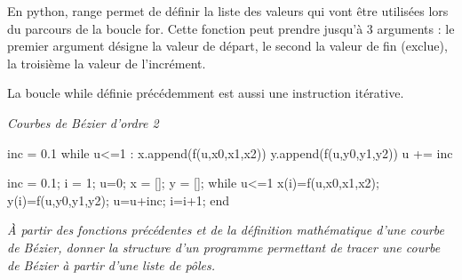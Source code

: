 \documentclass[10pt,fleqn]{article} %
\begin{document}
\begin{rem}
En python, \textsf{range} permet de définir la liste des valeurs qui vont être utilisées lors du parcours de la boucle \textsf{for}.  Cette fonction peut prendre jusqu'à 3 arguments : le premier argument désigne la valeur de départ, le second la valeur de fin (exclue), la troisième la valeur de l'incrément. 
\end{rem}

\begin{rem}
La boucle \textsf{while} définie précédemment est aussi une instruction itérative. 
\end{rem}


\begin{exemple}
\textit{Courbes de Bézier d'ordre 2}


\begin{minipage}[c]{.49\linewidth}
\begin{py}
\begin{python}
inc = 0.1
while u<=1 :
    x.append(f(u,x0,x1,x2))
    y.append(f(u,y0,y1,y2))
    u += inc
\end{python}
\end{py}
\end{minipage}\hfill
\begin{minipage}[c]{.49\linewidth}
\begin{sci}
\begin{scilab}
inc = 0.1; i = 1;
u=0;
x = []; y = [];
while u<=1
    x(i)=f(u,x0,x1,x2);
    y(i)=f(u,y0,y1,y2);
    u=u+inc;
    i=i+1;
end
\end{scilab}
\end{sci}
\end{minipage}

\end{exemple}



\begin{exemple}
\textit{\`A partir des fonctions précédentes et de la définition mathématique d'une courbe de Bézier, donner la structure d'un programme permettant de tracer une courbe de Bézier à partir d'une liste de pôles.}

\end{exemple}
\begin{thebibliography}{2}
\end{thebibliography}
\end{document}
